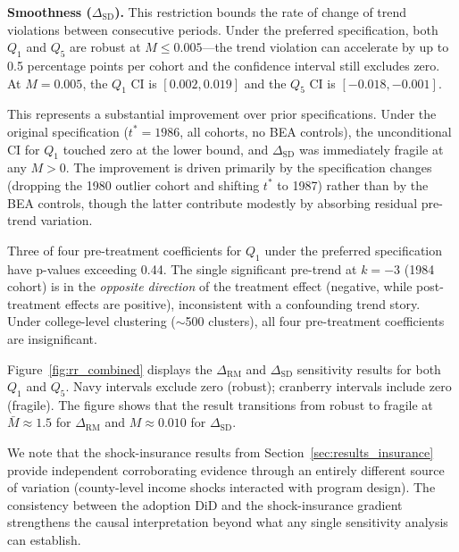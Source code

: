 \textbf{Smoothness ($\Delta_\text{SD}$).} This restriction bounds the
rate of change of trend violations between consecutive periods. Under
the preferred specification, both $Q_1$ and $Q_5$ are robust at $M
\leq 0.005$---the trend violation can accelerate by up to 0.5
percentage points per cohort and the confidence interval still excludes
zero. At $M = 0.005$, the $Q_1$ CI is $[0.002, 0.019]$ and the $Q_5$
CI is $[-0.018, -0.001]$.

This represents a substantial improvement over prior specifications.
Under the original specification ($t^* = 1986$, all cohorts, no BEA
controls), the unconditional CI for $Q_1$ touched zero at the lower
bound, and $\Delta_\text{SD}$ was immediately fragile at any $M > 0$.
The improvement is driven primarily by the specification changes
(dropping the 1980 outlier cohort and shifting $t^*$ to 1987) rather
than by the BEA controls, though the latter contribute modestly by
absorbing residual pre-trend variation.

Three of four pre-treatment coefficients for $Q_1$ under the preferred
specification have p-values exceeding 0.44. The single significant
pre-trend at $k = -3$ (1984 cohort) is in the \emph{opposite direction}
of the treatment effect (negative, while post-treatment effects are
positive), inconsistent with a confounding trend story. Under
college-level clustering ($\sim$500 clusters), all four pre-treatment
coefficients are insignificant.

Figure~\ref{fig:rr_combined} displays the $\Delta_\text{RM}$ and
$\Delta_\text{SD}$ sensitivity results for both $Q_1$ and $Q_5$.
Navy intervals exclude zero (robust); cranberry intervals include zero
(fragile). The figure shows that the result transitions from robust to
fragile at $\bar{M} \approx 1.5$ for $\Delta_\text{RM}$ and $M
\approx 0.010$ for $\Delta_\text{SD}$.

We note that the shock-insurance results from
Section~\ref{sec:results_insurance} provide independent corroborating
evidence through an entirely different source of variation (county-level
income shocks interacted with program design). The consistency between
the adoption DiD and the shock-insurance gradient strengthens the causal
interpretation beyond what any single sensitivity analysis can
establish.

